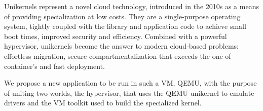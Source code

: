 Unikernels represent a novel cloud technology, introduced in the 2010s as a means of providing specialization at low costs.
They are a single-purpose operating system, tightly coupled with the library and application code to achieve small boot times, improved security and efficiency.
Combined with a powerful hypervisor, unikernels become the answer to modern cloud-based problems: effortless migration, secure compartmentalization that exceeds the one of container's and fast deployment.

We propose a new application to be run in such a VM, QEMU, with the purpose of uniting two worlds, the hypervisor, that uses the QEMU unikernel to emulate drivers and the VM toolkit used to build the specialized kernel.

